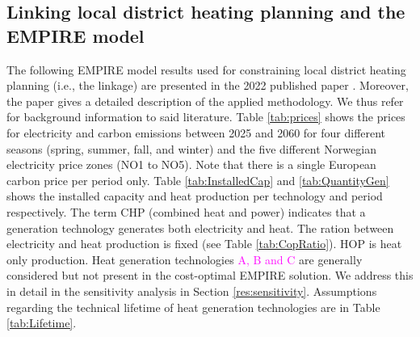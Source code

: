 \subsection{Linking local district heating planning and the EMPIRE model}\label{Linkage}
The following EMPIRE model results used for constraining local district heating planning (i.e., the linkage) are presented in the 2022 published paper \cite{backe2022impact}. Moreover, the paper gives a detailed description of the applied methodology. We thus refer for background information to said literature. Table \ref{tab:prices} shows the prices for electricity and carbon emissions between 2025 and 2060 for four different seasons (spring, summer, fall, and winter) and the five different Norwegian electricity price zones (NO1 to NO5). Note that there is a single European carbon price per period only. Table \ref{tab:InstalledCap} and \ref{tab:QuantityGen} shows the installed capacity and heat production per technology and period respectively. The term CHP (combined heat and power) indicates that a generation technology generates both electricity and heat. The ration between electricity and heat production is fixed (see Table \ref{tab:CopRatio}). HOP is heat only production. Heat generation technologies \textcolor{magenta}{A, B and C} are generally considered but not present in the cost-optimal EMPIRE solution. We address this in detail in the sensitivity analysis in Section \ref{res:sensitivity}. Assumptions regarding the technical lifetime of heat generation technologies are in Table \ref{tab:Lifetime}.

